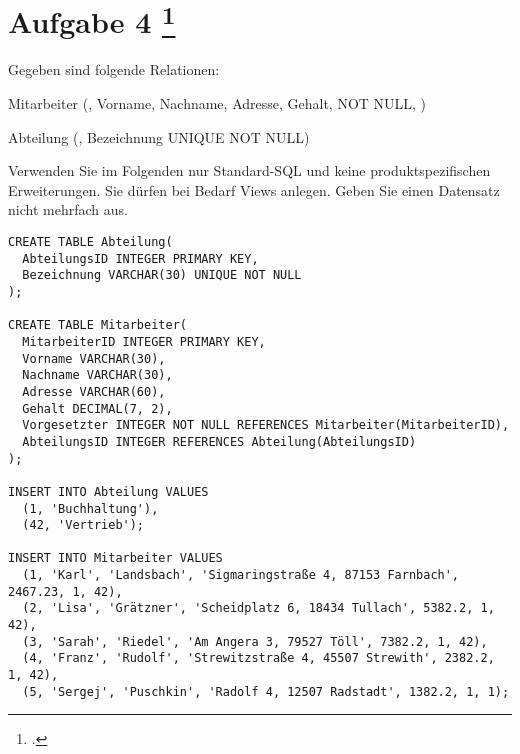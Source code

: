 \documentclass{lehramt-informatik-aufgabe}
\begin{document}
\section{Aufgabe 4
\footcite{examen:66116:2021:03}}

Gegeben sind folgende Relationen:

\begin{liRmodell}
Mitarbeiter (, Vorname, Nachname, Adresse,
Gehalt,  NOT NULL, )

\bigskip

Abteilung (, Bezeichnung UNIQUE NOT NULL)
\end{liRmodell}

Verwenden Sie im Folgenden nur Standard-SQL und keine
produktspezifischen Erweiterungen. Sie dürfen bei Bedarf Views anlegen.
Geben Sie einen Datensatz nicht mehrfach aus.

\begin{verbatim}
CREATE TABLE Abteilung(
  AbteilungsID INTEGER PRIMARY KEY,
  Bezeichnung VARCHAR(30) UNIQUE NOT NULL
);

CREATE TABLE Mitarbeiter(
  MitarbeiterID INTEGER PRIMARY KEY,
  Vorname VARCHAR(30),
  Nachname VARCHAR(30),
  Adresse VARCHAR(60),
  Gehalt DECIMAL(7, 2),
  Vorgesetzter INTEGER NOT NULL REFERENCES Mitarbeiter(MitarbeiterID),
  AbteilungsID INTEGER REFERENCES Abteilung(AbteilungsID)
);

INSERT INTO Abteilung VALUES
  (1, 'Buchhaltung'),
  (42, 'Vertrieb');

INSERT INTO Mitarbeiter VALUES
  (1, 'Karl', 'Landsbach', 'Sigmaringstraße 4, 87153 Farnbach', 2467.23, 1, 42),
  (2, 'Lisa', 'Grätzner', 'Scheidplatz 6, 18434 Tullach', 5382.2, 1, 42),
  (3, 'Sarah', 'Riedel', 'Am Angera 3, 79527 Töll', 7382.2, 1, 42),
  (4, 'Franz', 'Rudolf', 'Strewitzstraße 4, 45507 Strewith', 2382.2, 1, 42),
  (5, 'Sergej', 'Puschkin', 'Radolf 4, 12507 Radstadt', 1382.2, 1, 1);

\end{verbatim}
\end{document}
